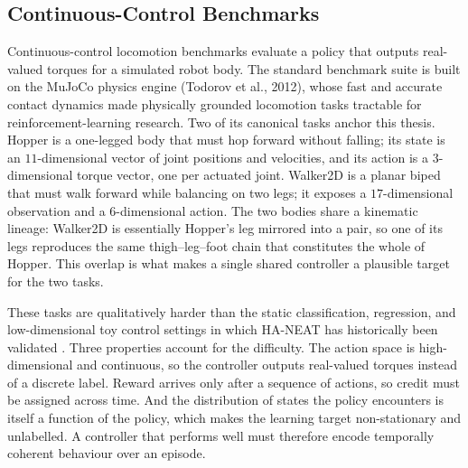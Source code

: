 \documentclass[12pt]{article}
\begin{document}
\subsection{Continuous-Control Benchmarks}
\label{subsec:control-benchmarks}


Continuous-control locomotion benchmarks evaluate a policy that outputs real-valued torques for a simulated robot body.
The standard benchmark suite \cite{brockman_openai_2016, duan_benchmarking_2016} is built on the MuJoCo physics engine (Todorov et al., 2012), whose fast and accurate contact dynamics made physically grounded locomotion tasks tractable for reinforcement-learning research.
Two of its canonical tasks anchor this thesis.
Hopper is a one-legged body that must hop forward without falling; its state is an $11$-dimensional vector of joint positions and velocities, and its action is a $3$-dimensional torque vector, one per actuated joint.
Walker2D is a planar biped that must walk forward while balancing on two legs; it exposes a $17$-dimensional observation and a $6$-dimensional action.
The two bodies share a kinematic lineage: Walker2D is essentially Hopper's leg mirrored into a pair, so one of its legs reproduces the same thigh--leg--foot chain that constitutes the whole of Hopper.
This overlap is what makes a single shared controller a plausible target for the two tasks.

These tasks are qualitatively harder than the static classification, regression, and low-dimensional toy control settings in which HA-NEAT has historically been validated \cite{hagg_evolving_2017}.
Three properties account for the difficulty.
The action space is high-dimensional and continuous, so the controller outputs real-valued torques instead of a discrete label.
Reward arrives only after a sequence of actions, so credit must be assigned across time.
And the distribution of states the policy encounters is itself a function of the policy, which makes the learning target non-stationary and unlabelled.
A controller that performs well must therefore encode temporally coherent behaviour over an episode.
\end{document}
